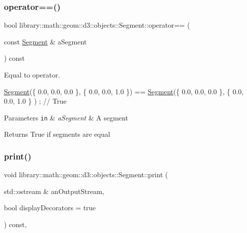 \subsubsection{\texorpdfstring{operator==()}{operator==()}}
{\footnotesize\ttfamily bool library\+::math\+::geom\+::d3\+::objects\+::\+Segment\+::operator== (\begin{DoxyParamCaption}\item[{const \hyperlink{classlibrary_1_1math_1_1geom_1_1d3_1_1objects_1_1_segment}{Segment} \&}]{a\+Segment }\end{DoxyParamCaption}) const}



Equal to operator. 


\begin{DoxyCode}
\hyperlink{classlibrary_1_1math_1_1geom_1_1d3_1_1objects_1_1_segment_a5562342d1edf2f52e37ce1bc138ee7d7}{Segment}(\{ 0.0, 0.0, 0.0 \}, \{ 0.0, 0.0, 1.0 \}) == \hyperlink{classlibrary_1_1math_1_1geom_1_1d3_1_1objects_1_1_segment_a5562342d1edf2f52e37ce1bc138ee7d7}{Segment}(\{ 0.0, 0.0, 0.0 \}, \{ 0.0, 0.0, 1.0 \}
      ) ; \textcolor{comment}{// True}
\end{DoxyCode}



\begin{DoxyParams}[1]{Parameters}
\mbox{\tt in}  & {\em a\+Segment} & A segment \\
\hline
\end{DoxyParams}
\begin{DoxyReturn}{Returns}
True if segments are equal 
\end{DoxyReturn}
\mbox{\label{classlibrary_1_1math_1_1geom_1_1d3_1_1objects_1_1_segment_a2d3c1a17842ee4ee83cffda33911291d}} 
\subsubsection{\texorpdfstring{print()}{print()}}
{\footnotesize\ttfamily void library\+::math\+::geom\+::d3\+::objects\+::\+Segment\+::print (\begin{DoxyParamCaption}\item[{std\+::ostream \&}]{an\+Output\+Stream,  }\item[{bool}]{display\+Decorators = {\ttfamily true} }\end{DoxyParamCaption}) const\hspace{0.3cm}{\ttfamily [override]}, {\ttfamily [virtual]}}



